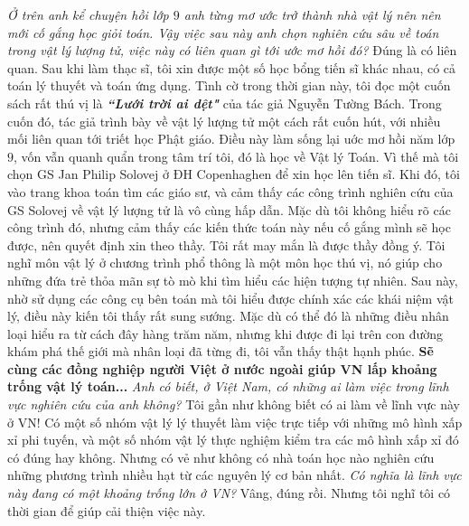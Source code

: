 \begin{multicols}{2}
	\vskip 0.1cm
	\textit{Ở trên anh kể chuyện hồi lớp $9$ anh từng mơ ước trở thành nhà vật lý nên nên mới cố gắng học giỏi toán. Vậy việc sau này anh chọn nghiên cứu sâu về toán trong vật lý lượng tử, việc này có liên quan gì tới ước mơ hồi đó?}
	\vskip 0.1cm 
	Đúng là có liên quan. Sau khi làm thạc sĩ, tôi xin được một số học bổng tiến sĩ khác nhau, có cả toán lý thuyết và toán ứng dụng. Tình cờ trong thời gian này, tôi đọc một cuốn sách rất thú vị là \textbf{\color{diendantoanhoc}\textit{``Lưới trời ai dệt"}} của tác giả Nguyễn Tường Bách. Trong cuốn đó, tác giả trình bày về vật lý lượng tử một cách rất cuốn hút, với nhiều mối liên quan tới triết học Phật giáo. Điều này làm sống lại uớc mơ hồi năm lớp $9$, vốn vẫn quanh quẩn trong tâm trí tôi, đó là học về Vật lý Toán.  
	\vskip 0.1cm
	Vì thế mà tôi chọn GS Jan Philip Solovej ở ĐH Copenhaghen để xin học lên tiến sĩ. Khi đó, tôi vào trang khoa toán tìm các giáo sư, và cảm thấy các công trình nghiên cứu của GS Solovej về vật lý lượng tử là vô cùng hấp dẫn. Mặc dù tôi không hiểu rõ các công trình đó, nhưng cảm thấy các kiến thức toán này nếu cố gắng mình sẽ học được, nên quyết định xin theo thầy. Tôi rất may mắn là được thầy đồng ý. 
	\vskip 0.1cm
	Tôi nghĩ môn vật lý ở chương trình phổ thông là một môn học thú vị, nó giúp cho những đứa trẻ thỏa mãn sự tò mò khi tìm hiểu các hiện tượng tự nhiên. Sau này, nhờ sử dụng các công cụ bên toán mà tôi hiểu được chính xác các khái niệm vật lý, điều này kiến tôi thấy rất sung sướng. Mặc dù có thể đó là những điều nhân loại hiểu ra từ cách đây hàng trăm năm, nhưng khi được đi lại trên con đường khám phá thế giới mà nhân loại đã từng đi, tôi vẫn thấy thật hạnh phúc. 
	\vskip 0.1cm
	\textbf{\color{diendantoanhoc}Sẽ cùng các đồng nghiệp người Việt ở nước ngoài giúp VN lấp khoảng trống vật lý toán...}
	\vskip 0.1cm
	\textit{Anh có biết, ở Việt Nam, có những ai làm việc trong lĩnh vực nghiên cứu của anh không?}
	\vskip 0.1cm 
	Tôi gần như không biết có ai làm về lĩnh vực này ở VN! Có một số nhóm vật lý lý thuyết làm việc trực tiếp với những mô hình xấp xỉ phi tuyến, và một số nhóm vật lý thực nghiệm kiểm tra các mô hình xấp xỉ đó có đúng hay không. Nhưng có vẻ như không có nhà toán học nào nghiên cứu những phương trình nhiều hạt từ các nguyên lý cơ \linebreak bản nhất.  
	\vskip 0.1cm
	\textit{Có nghĩa là lĩnh vực này đang có một khoảng trống lớn ở VN?}
	\vskip 0.1cm 
	Vâng, đúng rồi. Nhưng tôi nghĩ tôi có thời gian để giúp cải thiện việc này. 
	\begin{figure}[H]
		\centering
		\vspace*{-5pt}

\end{figure}
\end{multicols}

